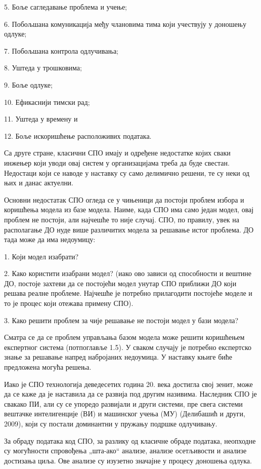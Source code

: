 5. Боље сагледавање проблема и учење;

6. Побољшана комуникација међу члановима тима који учествују у доношењу одлуке;

7. Побољшана контрола одлучивања;

8. Уштеда у трошковима;

9. Боље одлуке;

10. Ефикаснији тимски рад;

11. Уштеда у времену и

12. Боље искоришћење расположивих података.

Са друге стране, класични СПО имају и одређене недостатке којих сваки инжењер који уводи овај систем у организацијама треба да буде свестан. Недостаци који се наводе у наставку су само делимично решени, те су неки од њих и данас актуелни.

Основни недостатак СПО огледа се у чињеници да постоји проблем избора и коришћења модела из базе модела. Наиме, када СПО има само један модел, овај проблем не постоји, али најчешће то није случај. СПО, по правилу, увек на располагање ДО нуде више различитих модела за решавање истог проблема. ДО тада може да има недоумицу:

1. Који модел изабрати?

2. Како користити изабрани модел? (иако ово зависи од способности и вештине ДО, постоје захтеви да се постојећи модел унутар СПО приближи ДО који решава реалне проблеме. Најчешће је потребно прилагодити постојеће моделе и то је процес који отежава примену СПО).

3. Како решити проблем за чије решавање не постоји модел у бази модела?

Сматра се да се проблем управљања базом модела може решити коришћењем експертног система (потпоглавље 1.5). У сваком случају је потребно експертско знање за решавање напред набројаних недоумица. У наставку књиге биће предложена могућа решења.

Иако је СПО технологија деведесетих година 20. века достигла свој зенит, може да се каже да је наставила да се развија под другим називима. Наследник СПО је свакако ПИ, али су се упоредо развијали и други системи, пре свега системи вештачке интелигенције (ВИ) и машинског учења (МУ) (Делибашић и други, 2009), који су постали доминантни у пружању подршке одлучивању.

За обраду података код СПО, за разлику од класичне обраде података, неопходне су могућности спровођења „шта-ако“ анализе, анализе осетљивости и анализе достизања циља. Ове анализе су изузетно значајне у процесу доношења одлука.

